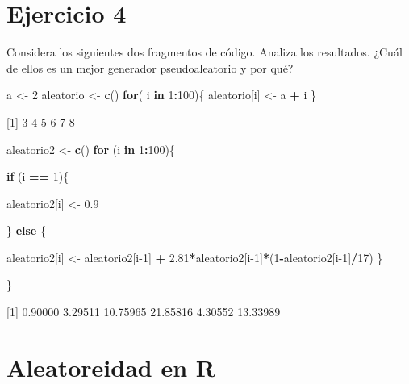 \documentclass[
]{book}
\newenvironment{Shaded}{\begin{snugshade}}{\end{snugshade}}
\newcommand{\ControlFlowTok}[1]{\textcolor[rgb]{0.13,0.29,0.53}{\textbf{#1}}}
\newcommand{\DecValTok}[1]{\textcolor[rgb]{0.00,0.00,0.81}{#1}}
\newcommand{\FloatTok}[1]{\textcolor[rgb]{0.00,0.00,0.81}{#1}}
\newcommand{\KeywordTok}[1]{\textcolor[rgb]{0.13,0.29,0.53}{\textbf{#1}}}
\newcommand{\NormalTok}[1]{#1}
\newcommand{\OperatorTok}[1]{\textcolor[rgb]{0.81,0.36,0.00}{\textbf{#1}}}
\newcommand{\StringTok}[1]{\textcolor[rgb]{0.31,0.60,0.02}{#1}}
\begin{document}
\hypertarget{ejercicio-4}{%
\section{Ejercicio 4}\label{ejercicio-4}}

Considera los siguientes dos fragmentos de código. Analiza los resultados. ¿Cuál de ellos es un mejor generador pseudoaleatorio y por qué?

\begin{Shaded}
\begin{Highlighting}[]
\NormalTok{a         <-}\StringTok{ }\DecValTok{2}
\NormalTok{aleatorio <-}\StringTok{ }\KeywordTok{c}\NormalTok{()}
\ControlFlowTok{for}\NormalTok{( i }\ControlFlowTok{in} \DecValTok{1}\OperatorTok{:}\DecValTok{100}\NormalTok{)\{}
\NormalTok{  aleatorio[i] <-}\StringTok{ }\NormalTok{a }\OperatorTok{+}\StringTok{ }\NormalTok{i}
\NormalTok{\}}
\end{Highlighting}
\end{Shaded}

{[}1{]} 3 4 5 6 7 8

\begin{Shaded}
\begin{Highlighting}[]
\NormalTok{aleatorio2 <-}\StringTok{ }\KeywordTok{c}\NormalTok{()}
\ControlFlowTok{for}\NormalTok{ (i }\ControlFlowTok{in} \DecValTok{1}\OperatorTok{:}\DecValTok{100}\NormalTok{)\{}
  
  \ControlFlowTok{if}\NormalTok{ (i }\OperatorTok{==}\StringTok{ }\DecValTok{1}\NormalTok{)\{}
    
\NormalTok{    aleatorio2[i] <-}\StringTok{ }\FloatTok{0.9}
    
\NormalTok{  \} }\ControlFlowTok{else}\NormalTok{ \{}
    
\NormalTok{    aleatorio2[i] <-}\StringTok{ }\NormalTok{aleatorio2[i}\DecValTok{-1}\NormalTok{] }\OperatorTok{+}\StringTok{ }
\StringTok{                   }\FloatTok{2.81}\OperatorTok{*}\NormalTok{aleatorio2[i}\DecValTok{-1}\NormalTok{]}\OperatorTok{*}\NormalTok{(}\DecValTok{1}\OperatorTok{-}\NormalTok{aleatorio2[i}\DecValTok{-1}\NormalTok{]}\OperatorTok{/}\DecValTok{17}\NormalTok{)}
\NormalTok{  \}}
  
\NormalTok{\}}
\end{Highlighting}
\end{Shaded}

{[}1{]} 0.90000 3.29511 10.75965 21.85816 4.30552 13.33989

\hypertarget{aleatoreidad-en-r}{%
\section{Aleatoreidad en R}\label{aleatoreidad-en-r}}
\end{document}
